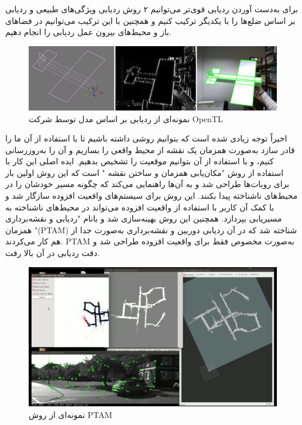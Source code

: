 \begin{itemize}
	برای به‌دست آوردن ردیابی قوی‌تر می‌توانیم ۲ روش ردیابی ویژگی‌های طبیعی و ردیابی بر اساس ضلع‌ها را با یکدیگر ترکیب کنیم\cite{vacchetti2003fusing} و همچنین با این ترکیب می‌توانیم در فضاهای باز و محیط‌های بیرون عمل ردیابی را انجام دهیم\cite{comport2006real}.
	\begin{figure}
		\centering
		\includegraphics[width=1\linewidth]{image/mbt}
		\caption {نمونه‌ای از ردیابی بر اساس مدل توسط شرکت OpenTL   \cite{mbt}}
		\label{fig:ptam}
	\end{figure}
	اخیراً توجه زیادی شده است که بتوانیم روشی داشته باشیم تا با استفاده از آن ما را قادر سازد به‌صورت همزمان یک نقشه از محیط واقعی را بسازیم و آن را به‌روزرسانی کنیم، و با استفاده از آن بتوانیم موقعیت را تشخیص بدهیم. ایده اصلی این کار با استفاده از روش "مکان‌یابی همزمان و ساختن نقشه " است که این روش اولین بار برای روبات‌ها طراحی شد\cite{dissanayake2001solution} و به آن‌ها راهنمایی می‌کند که چگونه مسیر خودشان را در محیط‌های ناشناخته پیدا بکنند. این روش برای سیستم‌های واقعیت افزوده سازگار شد و با کمک آن کاربر با استفاده از واقعیت افزوده می‌تواند در محیط‌های ناشناخته به مسیریابی بپردازد. همچنین این روش بهینه‌سازی شد و بانام "ردیابی و نقشه‌برداری همزمان "(PTAM) شناخته شد که در آن ردیابی دوربین و نقشه‌برداری به‌صورت جدا از هم کار می‌کردند. PTAM به‌صورت مخصوص فقط برای واقعیت افزوده طراحی شد و دقت ردیابی در آن بالا رفت\cite{davison2007monoslam}.
		\begin{figure}
		\centering
		\includegraphics[width=1\linewidth]{image/ptam}
		\caption {نمونه‌ای از روش PTAM    \cite{murORB2}}
		\label{fig:ptam}
	\end{figure}
	
\end{itemize}

